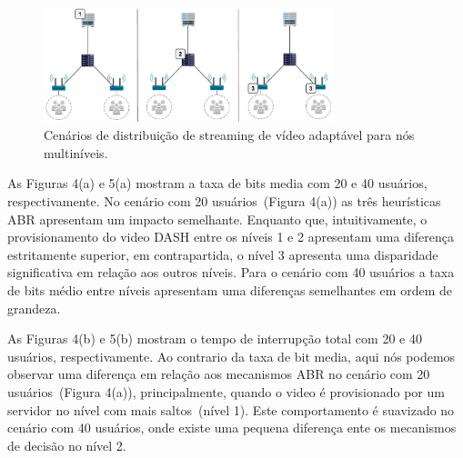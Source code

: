 

\vspace{0.8cm}
\begin{figure}[htpb]
	\centering
	\includegraphics[width=0.75\textwidth]{img/exp-multi-lvl}
	\caption{Cenários de distribuição de streaming de vídeo adaptável para nós multiníveis.}
	\label{fig:scenario-arch}
\end{figure}

As Figuras 4(a) e 5(a) mostram a taxa de bits media com 20 e 40 usuários, respectivamente. No cenário com 20 usuários~(Figura 4(a)) as três heurísticas ABR apresentam um impacto semelhante. Enquanto que, intuitivamente, o provisionamento do video DASH entre os níveis 1 e 2 apresentam uma diferença estritamente superior, em contrapartida, o nível 3 apresenta uma disparidade significativa em relação aos outros níveis. Para o cenário com 40 usuários a taxa de bits médio entre níveis apresentam uma diferenças semelhantes em ordem de grandeza. 

As Figuras 4(b) e 5(b) mostram o tempo de interrupção total com 20 e 40 usuários, respectivamente. Ao contrario da taxa de bit media, aqui nós podemos observar uma diferença em relação aos mecanismos ABR no cenário com 20 usuários~(Figura 4(a)), principalmente, quando o video é provisionado por um servidor no nível com mais saltos~(nível 1). Este comportamento é suavizado no cenário com 40 usuários, onde existe uma pequena diferença ente os mecanismos de decisão no nível 2.

